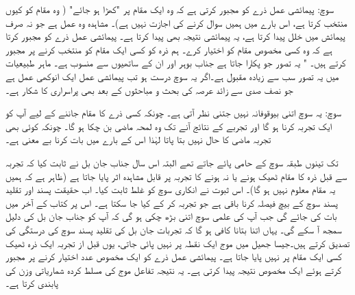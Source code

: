 \quad {}
 سوچ:  پیمائشی عمل ذرے کو مجبور کرتی ہے کہ وہ ایک مقام پر "کھڑا ہو جائے" ( وہ مقام  کو کیوں منتخب کرتا ہے،  اس بارے میں ہمیں سوال کرنے کی اجازت نہیں ہے)۔  مشاہدہ وہ عمل ہے جو نہ صرف پیمائش میں خلل پیدا کرتا ہے،  یہ پیمائشی نتیجہ بھی پیدا کرتا ہے۔ پیمائشی عمل ذرے کو مجبور کرتا ہے کہ وہ کسی مخصوص مقام کو اختیار کرے۔ ہم ذرہ کو کسی ایک مقام کو منتخب کرنے پر مجبور کرتے ہیں۔  " یہ تصور جو  پکارا جاتا ہے  جناب بوہر اور ان کے ساتھیوں سے منسوب   ہے۔ ماہر طبیعیات میں یہ تصور سب سے زیادہ مقبول ہے۔اگر یہ سوچ درست ہو تب پیمائشی عمل ایک انوکھی عمل ہے جو نصف صدی سے زائد عرصہ کی بحث و مباحثوں کے بعد  بھی پراسراری کا شکار  ہے۔

\quad {}
 سوچ:  یہ سوچ اتنی بیوقوفانہ نہیں  جتنی نظر آتی ہے۔ چونکہ کسی ذرے کا مقام جاننے کے لیے آپ کو ایک تجربہ کرنا ہو گا اور تجربے کے نتائج آنے تک وہ لمحہ  ماضی  بن چکا ہو گا۔ چونکہ کوئی بھی تجربہ ماضی کا حال نہیں  بتا پاتا لہٰذا اس کے بارے میں بات کرنا بے معنی ہے۔  

      تک تینوں طبقہ سوچ کے حامی پائے جاتے تھے البتہ اس سال  جناب جان بل نے  ثابت کیا کہ تجربہ سے قبل   ذرہ کا مقام ٹھیک  ہونے یا   نہ  ہونے کا  تجربہ پر قابل مشاہدہ اثر پایا جاتا ہے (ظاہر ہے کہ ہمیں یہ مقام معلوم نہیں ہو گا)۔ اس ثبوت نے انکاری سوچ کو غلط ثابت کیا۔ اب حقیقت پسند اور تقلید پسند سوچ کے بیچ   فیصلہ کرنا باقی ہے جو تجربہ کر کے کیا جا سکتا ہے۔ اس پر کتاب کے آخر میں بات کی جائے گی جب آپ کی علمی سوچ اتنی بڑھ چکی ہو گی کہ آپ کو  جناب جان بل کی دلیل سمجھ آ سکے گی۔ یہاں اتنا بتانا کافی ہو گا کہ تجربات  جان بل کی تقلید پسند سوچ کی درستگی کی تصدیق کرتے ہیں۔جیسا جھیل میں  موج ایک نقطہ پر نہیں پائی جاتی،  یوں  قبل از تجربہ  ایک ذرہ ٹھیک کسی  ایک مقام پر  نہیں پایا جاتا ہے۔  پیمائشی عمل ذرے کو ایک مخصوص عدد اختیار کرنے پر مجبور کرتے ہوئے  ایک مخصوص نتیجہ پیدا کرتی ہے۔ یہ نتیجہ تفاعل موج کی مسلط کردہ شماریاتی وزن کی پابندی کرتا ہے۔

